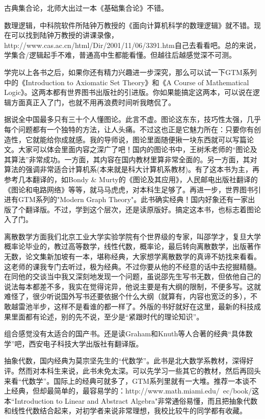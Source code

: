 古典集合论，北师大出过一本《基础集合论》不错。


数理逻辑，中科院软件所陆钟万教授的《面向计算机科学的数理逻辑》就不错。现在可以找到陆钟万教授的讲课录像，http://www.cas.ac.cn/html/Dir/2001/11/06/3391.htm自己去看看吧。总的来说，学集合/逻辑起手不难，普通高中生都能看懂。但越往后越感觉深不可测。


学完以上各书之后，如果你还有精力兴趣进一步深究，那么可以试一下GTM系列中的《Introduction to Axiomatic Set Theory》和《A Course of Mathematical Logic》。这两本都有世界图书出版社的引进版。你如果能搞定这两本，可以说在逻辑方面真正入了门，也就不用再浪费时间听我瞎侃了。


据说全中国最多只有三十个人懂图论。此言不虚。图论这东东，技巧性太强，几乎每个问题都有一个独特的方法，让人头痛。不过这也正是它魅力所在：只要你有创造性，它就能给你成就感。我的导师说，图论里面随便揪一块东西就可以写篇论文。大家可以体会里面内容之深广了吧！国内的图论书中，王树禾老师的“图论及其算法”非常成功。一方面，其内容在国内教材里算非常全面的。另一方面，其对算法的强调非常适合计算机系(本来就是科大计算机系教材)。有了这本书为主，再参考几本翻译的，如Bondy \& Murty的《图论及其应用》，人民邮电出版社翻译的《图论和电路网络》等等，就马马虎虎，对本科生足够了。再进一步，世界图书引进有GTM系列的"Modern Graph Theory"。此书确实经典！国内好象还有一家出版了个翻译版。不过，学到这个层次，还是读原版好。搞定这本书，也标志着图论入了门。


离散数学方面我们北京工业大学实验学院有个世界级的专家，叫邵学才，复旦大学概率论毕业的，教过高等数学，线性代数，概率论，最后转向离散数学，出版著作无数，论文集新加坡有一本，堪称经典，大家想学离散数学的真谛不妨找来看看。这老师的课我专门去听过，极为经典。不过你要从他的不经意的话中去挖掘精髓。在同他的交谈当中我又深刻地发现一个问题，虽说邵先生写书无数，但依他自己的说法每本都差不多，我实在觉得诧异，他说主要是有大纲的限制，不便多写。这就难怪了，很少听说国外写书还要依据个什么大纲（就算有，内容也宽泛的多），不敢越雷池半步，这样不是看谁的都一样了。外版的书好就好在这里，最新的科技成果里面都有论述，别的先不说，至少是“紧跟时代的理论知识”。


组合感觉没有太适合的国产书。还是读Graham和Knuth等人合著的经典“具体数学”吧，西安电子科技大学出版社有翻译版。


抽象代数，国内经典为莫宗坚先生的“代数学”。此书是北大数学系教材，深得好评。然而对本科生来说，此书未免太深。可以先学习一些其它的教材，然后再回头来看“代数学”。国际上的经典可就多了，GTM系列里就有一大堆。推荐一本谈不上经典，但却最简单的，最容易学的：http://www.math.miami.edu/~ec/book/这本“Introduction to Linear and Abstract Algebra"非常通俗易懂，而且把抽象代数和线性代数结合起来，对初学者来说非常理想，我校比较牛的同学都有收藏。


